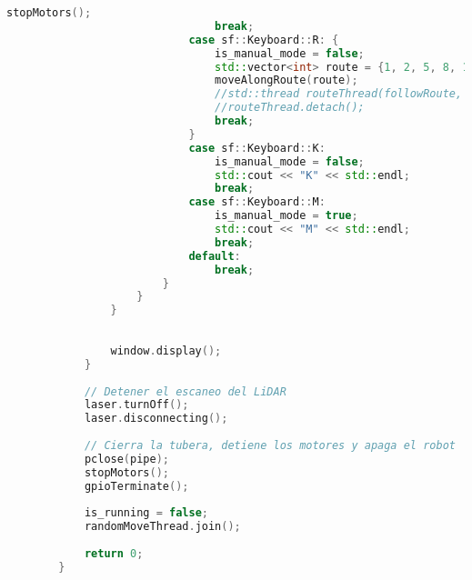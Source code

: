 \begin{lstlisting}[language={C++}, caption={Primer ajuste de c\'odigo}, label={Script}]
                                stopMotors();
                                break;
                            case sf::Keyboard::R: {
                                is_manual_mode = false;
                                std::vector<int> route = {1, 2, 5, 8, 11, 14, 13, 16};
                                moveAlongRoute(route);
                                //std::thread routeThread(followRoute, std::ref(window), std::ref(routePoints), std::ref(scan), minimap.getPosition(), max_range);
                                //routeThread.detach();
                                break;
                            }
                            case sf::Keyboard::K:
                                is_manual_mode = false;
                                std::cout << "K" << std::endl;
                                break;
                            case sf::Keyboard::M:
                                is_manual_mode = true;
                                std::cout << "M" << std::endl;
                                break;
                            default:
                                break;
                        }
                    }
                }
        
        
                window.display();
            }
        
            // Detener el escaneo del LiDAR
            laser.turnOff();
            laser.disconnecting();
        
            // Cierra la tubera, detiene los motores y apaga el robot
            pclose(pipe);
            stopMotors();
            gpioTerminate();
        
            is_running = false;
            randomMoveThread.join();
        
            return 0;
        }
    \end{lstlisting}